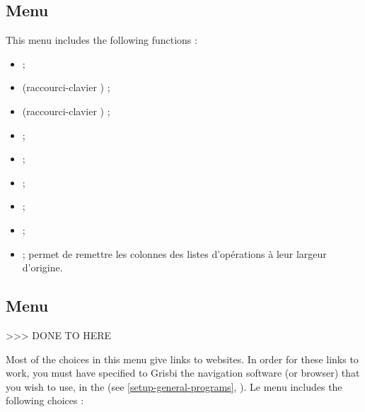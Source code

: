 \subsection{Menu \label{home-menus-display}}

This menu includes the following functions : 



\begin{itemize}
	 \item {} ; 
	 \item {} (raccourci-clavier ) ;
	 \item {} (raccourci-clavier ) ;
	 \item {} ;
	 \item {} ;
	 \item {} ;
	 \item {} ;
	 \item {} ;
	 \item {} ; permet de remettre les colonnes des listes d'opérations à leur largeur d'origine.
\end{itemize}


\subsection{Menu \label{home-menus-help}}

>>> DONE TO HERE



Most of the choices in this menu give links to websites. In order for these links to work, you must have specified to Grisbi the navigation software (or browser) that you wish to use, in the  (see \vref{setup-general-programs}, ). Le menu   includes the following choices :


